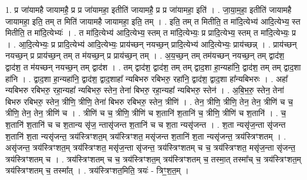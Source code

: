 \documentclass[17pt]{extarticle}
\begin{document}
1. प्र जा॑यामहै जायामहै॒ प्र प्र जा॑यामहा॒ इतीति॑ जायामहै॒ प्र प्र जा॑यामहा॒ इति॑ । . जा॒या॒म॒हा॒ इतीति॑ जायामहै जायामहा॒ इति॒ तम् त मिति॑ जायामहै जायामहा॒ इति॒ तम् । . इति॒ तम् त मितीति॒ त मा॑दि॒त्येभ्य॑ आदि॒त्येभ्य॒ स्त मितीति॒ त मा॑दि॒त्येभ्यः॑ । . त मा॑दि॒त्येभ्य॑ आदि॒त्येभ्य॒ स्तम् त मा॑दि॒त्येभ्यः॒ प्र प्रादि॒त्येभ्य॒ स्तम् त मा॑दि॒त्येभ्यः॒ प्र । . आ॒दि॒त्येभ्यः॒ प्र प्रादि॒त्येभ्य॑ आदि॒त्येभ्यः॒ प्राय॑च्छन् नयच्छ॒न् प्रादि॒त्येभ्य॑ आदि॒त्येभ्यः॒ प्राय॑च्छन्न् । . प्राय॑च्छन् नयच्छ॒न् प्र प्राय॑च्छ॒न् तम् त म॑यच्छ॒न् प्र प्राय॑च्छ॒न् तम् । . अ॒य॒च्छ॒न् तम् तम॑यच्छन् नयच्छ॒न् तम् द्वाद॑श॒ द्वाद॑श॒ त म॑यच्छन् नयच्छ॒न् तम् द्वाद॑श । . तम् द्वाद॑श॒ द्वाद॑श॒ तम् तम् द्वाद॒शा हा॒न्यहा॑नि॒ द्वाद॑श॒ तम् तम् द्वाद॒शा हा॑नि । . द्वाद॒शा हा॒न्यहा॑नि॒ द्वाद॑श॒ द्वाद॒शाहा᳚ न्यबिभरु रबिभरु॒ रहा॑नि॒ द्वाद॑श॒ द्वाद॒शा हा᳚न्यबिभरुः । . अहा᳚ न्यबिभरु रबिभरु॒ रहा॒न्यहा᳚ न्यबिभरु॒ स्तेन॒ तेना॑ बिभरु॒ रहा॒न्यहा᳚ न्यबिभरु॒ स्तेन॑ । . अ॒बि॒भ॒रु॒ स्तेन॒ तेना॑ बिभरु रबिभरु॒ स्तेन॒ त्रीणि॒ त्रीणि॒ तेना॑ बिभरु रबिभरु॒ स्तेन॒ त्रीणि॑ । . तेन॒ त्रीणि॒ त्रीणि॒ तेन॒ तेन॒ त्रीणि॑ च च॒ त्रीणि॒ तेन॒ तेन॒ त्रीणि॑ च । . त्रीणि॑ च च॒ त्रीणि॒ त्रीणि॑ च श॒तानि॑ श॒तानि॑ च॒ त्रीणि॒ त्रीणि॑ च श॒तानि॑ । . च॒ श॒तानि॑ श॒तानि॑ च च श॒तान्य सृ॑ज॒ न्तासृ॑जन्त श॒तानि॑ च च श॒ता न्यसृ॑जन्त । . श॒ता न्यसृ॑ज॒न्ता सृ॑जन्त श॒तानि॑ श॒ता न्यसृ॑जन्त॒ त्रय॑स्त्रिꣳशत॒म् त्रय॑स्त्रिꣳशत॒ मसृ॑जन्त श॒तानि॑ श॒ता न्यसृ॑जन्त॒ त्रय॑स्त्रिꣳशतम् । . असृ॑जन्त॒ त्रय॑स्त्रिꣳशत॒म् त्रय॑स्त्रिꣳशत॒ मसृ॑ज॒न्ता सृ॑जन्त॒ त्रय॑स्त्रिꣳशतम् च च॒ त्रय॑स्त्रिꣳशत॒ मसृ॑ज॒न्ता सृ॑जन्त॒ त्रय॑स्त्रिꣳशतम् च । . त्रय॑स्त्रिꣳशतम् च च॒ त्रय॑स्त्रिꣳशत॒म् त्रय॑स्त्रिꣳशतम् च॒ तस्मा॒त् तस्मा᳚च् च॒ त्रय॑स्त्रिꣳशत॒म् त्रय॑स्त्रिꣳशतम् च॒ तस्मा᳚त् । . त्रय॑स्त्रिꣳशत॒मिति॒ त्रयः॑ - त्रिꣳ॒॒श॒त॒म् । \newline
\end{document}
